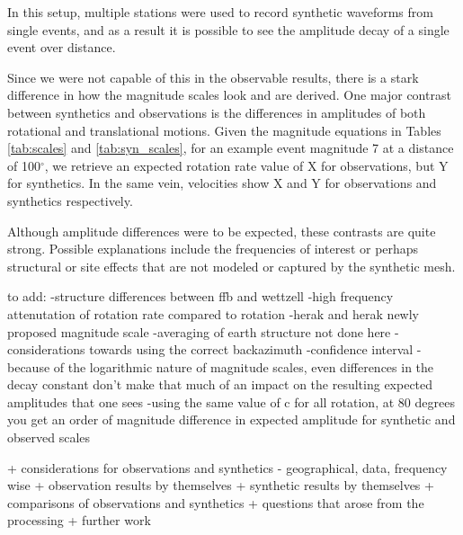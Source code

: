 \documentclass{gji}
\begin{document}
In this setup, multiple stations were used to record synthetic waveforms from single events, and as a result it is possible to see the amplitude decay of a single event over distance. 

Since we were not capable of this in the observable results, there is a stark difference in how the magnitude scales look and are derived. One major contrast between synthetics and observations is the differences in amplitudes of both rotational and translational motions. Given the magnitude equations in Tables \ref{tab:scales} and \ref{tab:syn_scales}, for an example event magnitude 7 at a distance of 100$^\circ$, we retrieve an expected rotation rate value of X for observations, but Y for synthetics. In the same vein, velocities show X and Y for observations and synthetics respectively.

Although amplitude differences were to be expected, these contrasts are quite strong. Possible explanations include the frequencies of interest or perhaps structural or site effects that are not modeled or captured by the synthetic mesh. %


to add: 
-structure differences between ffb and wettzell
-high frequency attenutation of rotation rate compared to rotation
-herak and herak newly proposed magnitude scale
-averaging of earth structure not done here
-considerations towards using the correct backazimuth
-confidence interval
-because of the logarithmic nature of magnitude scales, even differences in the decay constant don't make that much of an impact on the resulting expected amplitudes that one sees 
-using the same value of c for all rotation, at 80 degrees you get an order of magnitude difference in expected amplitude for synthetic and observed scales

+ considerations for observations and synthetics - geographical, data, frequency wise
+ observation results by themselves
+ synthetic results by themselves
+ comparisons of observations and synthetics
+ questions that arose from the processing
+ further work

\label{lastpage}
\end{document}
